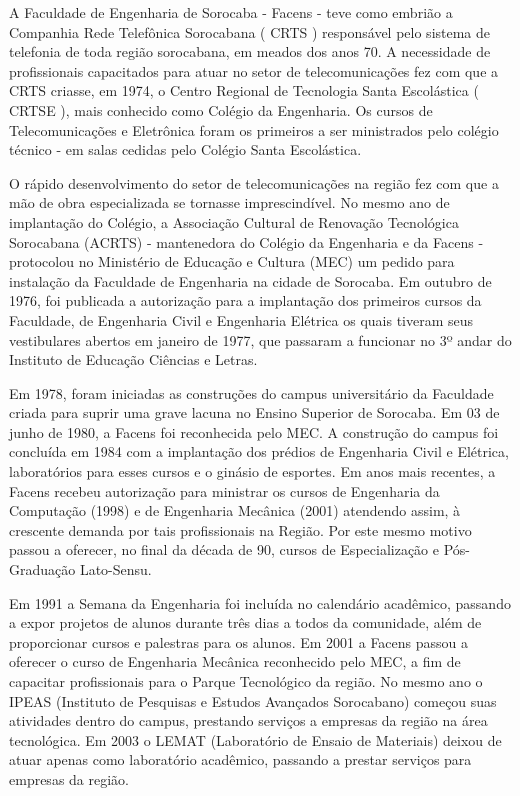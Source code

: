\documentclass[
	12pt,				%
	oneside,			%
	a4paper,			%
	chapter=TITLE,		%
	section=TITLE,		%
	sumario=tradicional %
	english,			%
	french,				%
	spanish,			%
	brazil				%
	]{abntex2}
\begin{document}
A Faculdade de Engenharia de Sorocaba - Facens - teve como embrião a Companhia Rede Telefônica Sorocabana ( CRTS ) responsável pelo sistema de telefonia de toda região sorocabana, em meados dos anos 70. A necessidade de profissionais capacitados para atuar no setor de telecomunicações fez com que a CRTS criasse, em 1974, o Centro Regional de Tecnologia Santa Escolástica ( CRTSE ), mais conhecido como Colégio da Engenharia. Os cursos de Telecomunicações e Eletrônica foram os primeiros a ser ministrados pelo colégio técnico - em salas cedidas pelo Colégio Santa Escolástica.

O rápido desenvolvimento do setor de telecomunicações na região fez com que a mão de obra especializada se tornasse imprescindível. No mesmo ano de implantação do Colégio, a Associação Cultural de Renovação Tecnológica Sorocabana (ACRTS) - mantenedora do Colégio da Engenharia e da Facens - protocolou no Ministério de Educação e Cultura (MEC) um pedido para instalação da Faculdade de Engenharia na cidade de Sorocaba. Em outubro de 1976, foi publicada a autorização para a implantação dos primeiros cursos da Faculdade, de Engenharia Civil e Engenharia Elétrica os quais tiveram seus vestibulares abertos em janeiro de 1977, que passaram a funcionar no 3º andar do Instituto de Educação Ciências e Letras.

Em 1978, foram iniciadas as construções do campus universitário da Faculdade criada para suprir uma grave lacuna no Ensino Superior de Sorocaba. Em 03 de junho de 1980, a Facens foi reconhecida pelo MEC. A construção do campus foi concluída em 1984 com a implantação dos prédios de Engenharia Civil e Elétrica, laboratórios para esses cursos e o ginásio de esportes.
Em anos mais recentes, a Facens recebeu autorização para ministrar os cursos de Engenharia da Computação (1998) e de Engenharia Mecânica (2001) atendendo assim, à crescente demanda por tais profissionais na Região. Por este mesmo motivo passou a oferecer, no final da década de 90, cursos de Especialização e Pós-Graduação Lato-Sensu.

Em 1991 a Semana da Engenharia foi incluída no calendário acadêmico, passando a expor projetos de alunos durante três dias a todos da comunidade, além de proporcionar cursos e palestras para os alunos. Em 2001 a Facens passou a oferecer o curso de Engenharia Mecânica reconhecido pelo MEC, a fim de capacitar profissionais para o Parque Tecnológico da região. No mesmo ano o IPEAS (Instituto de Pesquisas e Estudos Avançados Sorocabano) começou suas atividades dentro do campus, prestando serviços a empresas da região na área tecnológica. Em 2003 o LEMAT (Laboratório de Ensaio de Materiais) deixou de atuar apenas como laboratório acadêmico, passando a prestar serviços para empresas da região.
\end{document}
